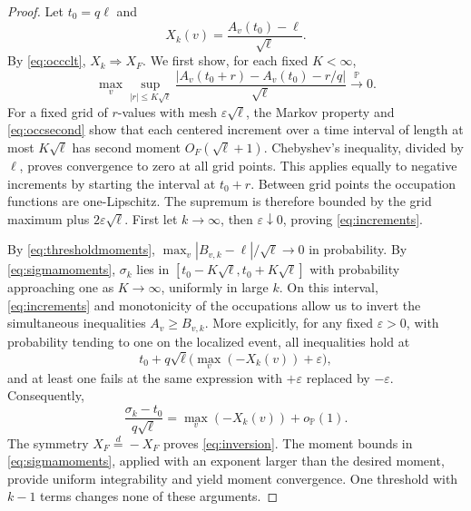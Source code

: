 \documentclass[11pt]{amsart}
\theoremstyle{remark}
\numberwithin{equation}{section}
\newcommand{\Prob}{\mathbb{P}}
\begin{document}
\begin{proof}
Let $t_0=q\ell$ and
\[
X_k(v)=\frac{A_v(t_0)-\ell}{\sqrt\ell}.
\]
By \eqref{eq:occclt}, $X_k\Longrightarrow X_F$. We first show, for each fixed $K<\infty$,
\begin{equation}\label{eq:increments}
\max_v\sup_{|r|\le K\sqrt\ell}\frac{|A_v(t_0+r)-A_v(t_0)-r/q|}{\sqrt\ell}\xrightarrow{\ \Prob\ }0.
\end{equation}
For a fixed grid of $r$-values with mesh $\varepsilon\sqrt\ell$, the Markov property and \eqref{eq:occsecond} show that each centered increment over a time interval of length at most $K\sqrt\ell$ has second moment $O_F(\sqrt\ell+1)$. Chebyshev's inequality, divided by $\ell$, proves convergence to zero at all grid points. This applies equally to negative increments by starting the interval at $t_0+r$. Between grid points the occupation functions are one-Lipschitz. The supremum is therefore bounded by the grid maximum plus $2\varepsilon\sqrt\ell$. First let $k\to\infty$, then $\varepsilon\downarrow 0$, proving \eqref{eq:increments}.

By \eqref{eq:thresholdmoments}, $\max_v|B_{v,k}-\ell|/\sqrt\ell\to 0$ in probability. By \eqref{eq:sigmamoments}, $\sigma_k$ lies in $[t_0-K\sqrt\ell,t_0+K\sqrt\ell]$ with probability approaching one as $K\to\infty$, uniformly in large $k$. On this interval, \eqref{eq:increments} and monotonicity of the occupations allow us to invert the simultaneous inequalities $A_v\ge B_{v,k}$. More explicitly, for any fixed $\varepsilon>0$, with probability tending to one on the localized event, all inequalities hold at
\[
t_0+q\sqrt\ell\Big(\max_v(-X_k(v))+\varepsilon\Big),
\]
and at least one fails at the same expression with $+\varepsilon$ replaced by $-\varepsilon$. Consequently,
\[
\frac{\sigma_k-t_0}{q\sqrt\ell}=\max_v(-X_k(v))+o_{\Prob}(1).
\]
The symmetry $X_F\overset{d}{=}-X_F$ proves \eqref{eq:inversion}. The moment bounds in \eqref{eq:sigmamoments}, applied with an exponent larger than the desired moment, provide uniform integrability and yield moment convergence. One threshold with $k-1$ terms changes none of these arguments.
\end{proof}
\end{document}
